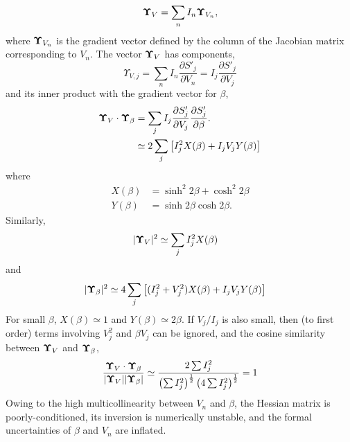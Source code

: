 \begin{equation}
\mbox{\boldmath $\Upsilon$}_V = \sum_n I_n \mbox{\boldmath $\Upsilon$}_{V_n},
\end{equation}
%
where $\mbox{\boldmath $\Upsilon$}_{V_n}$ is the gradient vector defined by the column of the Jacobian matrix corresponding to $V_n$.  The vector $\mbox{\boldmath $\Upsilon$}_V$ has components,
%
\begin{equation}
    \Upsilon_{V,j} = \sum_n I_n \frac{\partial S'_j}{\partial V_n} = I_j \frac{\partial S'_j}{\partial V_j}
\end{equation}
and its inner product with the gradient vector for $\beta$,
\begin{equation} \begin{split}
\mbox{\boldmath $\Upsilon$}_V \cdot \mbox{\boldmath $\Upsilon$}_\beta 
& = \sum_j I_j \frac{\partial S'_j}{\partial V_j} \frac{\partial S'_j}{\partial \beta}. \\
& \simeq
2 \sum_j \left[ I_j^2 X(\beta) + I_j V_j Y(\beta) \right]
\end{split} \end{equation}
where
\begin{equation} \begin{split}
X(\beta)&=\sinh^2 2\beta + \cosh^2 2\beta  \\
Y(\beta)&=\sinh 2\beta\cosh 2\beta.
\end{split} \end{equation}
Similarly,
\begin{align}
|\mbox{\boldmath $\Upsilon$}_V|^2 & \simeq \sum_j I_j^2 X(\beta)
\end{align}
and
\begin{align}
|\mbox{\boldmath $\Upsilon$}_\beta|^2 & \simeq 4 \sum_j \left[ (I_j^2+V_j^2) X(\beta) + I_jV_j Y(\beta) \right]
\end{align}
For small $\beta$, $X(\beta)\simeq 1$ and $Y(\beta) \simeq 2\beta$.
If $V_j/I_j$ is also small, then (to first order) terms involving $V_j^2$ and $\beta V_j$ can be ignored, and the cosine similarity between 
$\mbox{\boldmath $\Upsilon$}_V$ and $\mbox{\boldmath $\Upsilon$}_\beta$,
\begin{equation*}
\frac{\mbox{\boldmath $\Upsilon$}_V \cdot \mbox{\boldmath $\Upsilon$}_\beta}
     {|\mbox{\boldmath $\Upsilon$}_V| |\mbox{\boldmath $\Upsilon$}_\beta|} \simeq
     \frac{2 \sum I_j^2}{ \left(\sum I_j^2\right)^\frac{1}{2} \left(4\sum I_j^2\right)^\frac{1}{2} } = 1  
\end{equation*}
%
Owing to the high multicollinearity between $V_n$ and $\beta$, the Hessian matrix is poorly-conditioned, its inversion is numerically unstable, and the formal uncertainties of $\beta$ and $V_n$ are inflated.
